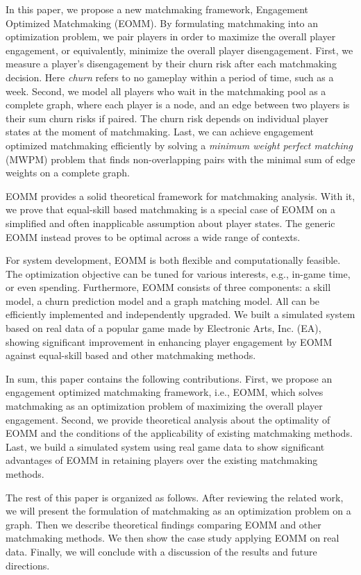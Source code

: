 In this paper, we propose a new matchmaking framework, Engagement Optimized Matchmaking (EOMM). By formulating matchmaking into an optimization problem, we pair players in order to maximize the overall player engagement, or equivalently, minimize the overall player disengagement.  First, we measure a player's disengagement by their churn risk after each matchmaking decision. Here \emph{churn} refers to no gameplay within a period of time, such as a week. Second, we model all players who wait in the matchmaking pool as a complete graph, where each player is a node, and an edge between two players is their sum churn risks if paired. The churn risk depends on individual player states at the moment of matchmaking. Last, we can achieve engagement optimized matchmaking efficiently by solving a \emph{minimum weight perfect matching} (MWPM) problem that finds non-overlapping pairs with the minimal sum of edge weights on a complete graph.

EOMM provides a solid theoretical framework for matchmaking analysis. With it, we prove that equal-skill based matchmaking is a special case of EOMM on a simplified and often inapplicable assumption about player states. The generic EOMM instead proves to be optimal across a wide range of  contexts.

For system development, EOMM is both flexible and computationally feasible. The optimization objective can be tuned for various interests, e.g., in-game time, or even spending. Furthermore, EOMM consists of three components: a skill model, a churn prediction model and a graph matching model. All can be efficiently implemented and independently upgraded. We built a simulated system based on real data of a popular game made by Electronic Arts,\! Inc.\! (EA), showing significant improvement in enhancing player engagement by EOMM against equal-skill based and other matchmaking methods.

In sum, this paper contains the following contributions. First, we propose an engagement optimized matchmaking framework, i.e., EOMM, which solves matchmaking as an optimization problem of maximizing the overall player engagement. Second, we provide theoretical analysis about the optimality of EOMM and the conditions of the applicability of existing matchmaking methods. Last, we build a simulated system using real game data to show significant advantages of EOMM in retaining players over the existing matchmaking methods.

The rest of this paper is organized as follows. After reviewing the related work, we will present the formulation of matchmaking as an optimization problem on a graph. Then we describe theoretical findings comparing EOMM and other matchmaking methods. We then show the case study applying EOMM on real data. Finally, we will conclude with a discussion of the results and future directions.



